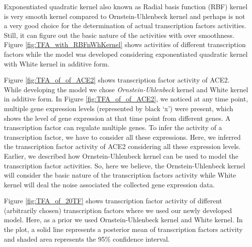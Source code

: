 Exponentiated quadratic kernel also known as Radial basis function (RBF) kernel is very smooth kernel compared to Ornstein-Uhlenbeck kernel and perhaps is not a very good choice for the determination of actual transcription factors activities. Still, it can figure out the basic nature of the activities with over smoothness. Figure \ref{fig:TFA_with_RBFnWhKernel} shows activities of different transcription factors while the model was developed considering exponentiated quadratic kernel with White kernel in additive form.

Figure \ref{fig:TFA_of_of_ACE2} shows transcription factor activity of ACE2. While developing the model we chose \emph{Ornstein-Uhlenbeck} kernel and White kernel in additive form. In Figure \ref{fig:TFA_of_of_ACE2}, we noticed at any time point, multiple gene expression levels (represented by black \lq x\rq) were present, which shows the level of gene expression at that time point from different genes. A transcription factor can regulate multiple genes. To infer the activity of a transcription factor, we have to consider all these expressions. Here, we inferred the transcription factor activity of ACE2 considering all these expression levels. Earlier, we described how  Ornstein-Uhlenbeck kernel can be used to model the transcription factor activities. So, here we believe, the Ornstein-Uhlenbeck kernel will consider the basic nature of the transcription factors activity while White kernel will deal the noise associated the collected gene expression data.

Figure \ref{fig:TFA_of_20TF} shows transcription factor activity of different (arbitrarily chosen) transcription factors  where we used our newly developed model. Here, as a prior we used Ornstein-Uhlenbeck kernel and White kernel. In the plot, a solid line represents a posterior mean of transcription factors activity and shaded area represents the 95\% confidence interval.


